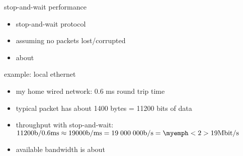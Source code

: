 \begin{frame}{stop-and-wait performance}
    \begin{itemize}
    \item stop-and-wait protocol
    \item assuming no packets lost/corrupted
    \vspace{.5cm}
    \item about 
    \end{itemize}
\end{frame}

\begin{frame}{example: local ethernet}
    \begin{itemize}
    \item my home wired network: 0.6 ms round trip time
    \item typical packet has about 1400 bytes = 11200 bits of data
    \item throughput with stop-and-wait: $11200 \text{b} / 0.6 \text{ms} \approx 19000 \text{b/ms} = 19\;000\;000 \text{b/s} = \myemph<2>{19 \text{Mbit/s}}$
    \vspace{.5cm}
    \item available bandwidth is about 
    \end{itemize}
\end{frame}
